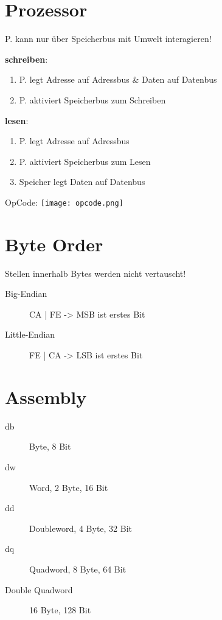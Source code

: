 

\newcommand{\TITLE}{Betriebssysteme 1}
\newcommand{\AUTHOR}{Mona Panchaud}
\newcommand{\INSTITUTE}{Ostschweizer Fachhochschule}

\begin{multicols*}{4}

\section{Prozessor}
P. kann nur über Speicherbus mit Umwelt interagieren!

\textbf{schreiben}:
\begin{enumerate}
    \item P. legt Adresse auf Adressbus \& Daten auf Datenbus
    \item P. aktiviert Speicherbus zum Schreiben
\end{enumerate}
\textbf{lesen}:
\begin{enumerate}
    \item P. legt Adresse auf Adressbus
    \item P. aktiviert Speicherbus zum Lesen
    \item Speicher legt Daten auf Datenbus
\end{enumerate}
OpCode: \texttt{[image: opcode.png]}

\section{Byte Order}
Stellen innerhalb Bytes werden nicht vertauscht!
\begin{description}
    \item[Big-Endian] CA | FE -> MSB ist erstes Bit
    \item[Little-Endian] FE | CA -> LSB ist erstes Bit
\end{description}

\section{Assembly}
\begin{description}
    \item[db] Byte, 8 Bit
    \item[dw] Word, 2 Byte, 16 Bit
    \item[dd] Doubleword, 4 Byte, 32 Bit
    \item[dq] Quadword, 8 Byte, 64 Bit
    \item [Double Quadword] 16 Byte, 128 Bit
\end{description}


\end{multicols*}
